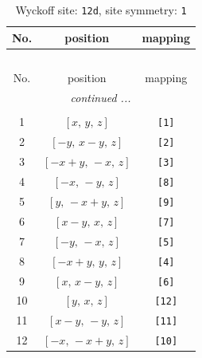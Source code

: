 \documentclass[fleqn,8pt]{jsarticle}
\begin{document}
\begin{longtable}{ccc}
\caption{Wyckoff site: {\tt 12d}, site symmetry: {\tt 1}}
 \\
 \hline \hline
No. & position & mapping \\ \hline \endfirsthead

\multicolumn{2}{l}{\tablename\ \thetable{}} \\
 \hline \hline
No. & position & mapping \\ \hline \endhead

 \hline \hline
\multicolumn{2}{r}{\footnotesize\it continued ...} \\ \endfoot

 \hline \hline
\multicolumn{2}{r}{} \\ \endlastfoot

1 & $\left[ x,\, y,\, z \right]$ & {\tt [1]} \\ \hline
2 & $\left[ - y,\, x - y,\, z \right]$ & {\tt [2]} \\ \hline
3 & $\left[ - x + y,\, - x,\, z \right]$ & {\tt [3]} \\ \hline
4 & $\left[ - x,\, - y,\, z \right]$ & {\tt [8]} \\ \hline
5 & $\left[ y,\, - x + y,\, z \right]$ & {\tt [9]} \\ \hline
6 & $\left[ x - y,\, x,\, z \right]$ & {\tt [7]} \\ \hline
7 & $\left[ - y,\, - x,\, z \right]$ & {\tt [5]} \\ \hline
8 & $\left[ - x + y,\, y,\, z \right]$ & {\tt [4]} \\ \hline
9 & $\left[ x,\, x - y,\, z \right]$ & {\tt [6]} \\ \hline
10 & $\left[ y,\, x,\, z \right]$ & {\tt [12]} \\ \hline
11 & $\left[ x - y,\, - y,\, z \right]$ & {\tt [11]} \\ \hline
12 & $\left[ - x,\, - x + y,\, z \right]$ & {\tt [10]} \\
\end{longtable}
\end{document}

